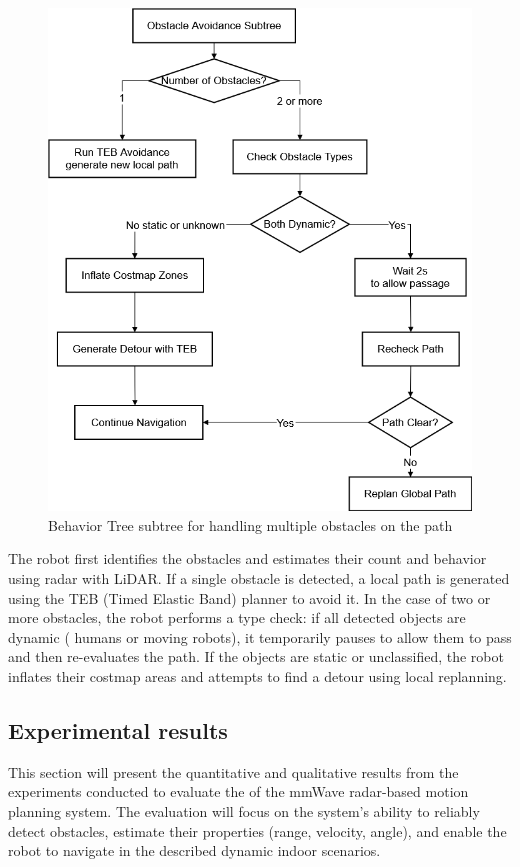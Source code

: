 \begin{figure}[H]
    \centering
    \includegraphics[width=0.65\linewidth]{Src//images/2obstaclebt.png}
    \caption{Behavior Tree subtree for handling multiple obstacles on the path}
    \label{fig:bt_multi_obstacle}
\end{figure}



The robot first identifies the obstacles and estimates their count and behavior using radar with LiDAR. If a single obstacle is detected, a local path is generated using the TEB (Timed Elastic Band) planner to avoid it. In the case of two or more obstacles, the robot performs a type check: if all detected objects are dynamic ( humans or moving robots), it temporarily pauses to allow them to pass and then re-evaluates the path. If the objects are static or unclassified, the robot inflates their costmap areas and attempts to find a detour using local replanning.

\subsection{Experimental results}

This section will present the quantitative and qualitative results from the experiments conducted to evaluate the of the mmWave radar-based motion planning system. The evaluation will focus on the system's ability to reliably detect obstacles, estimate their properties (range, velocity, angle), and enable the robot to navigate in the described dynamic indoor scenarios.


